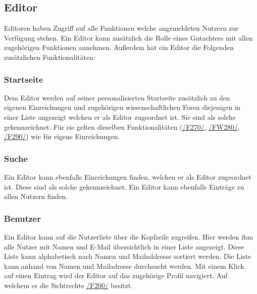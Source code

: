 \subsection{Editor}\label{funkt:editor}
Editoren haben Zugriff auf alle Funktionen welche angemeldeten Nutzern zur Verfügung stehen. Ein Editor kann zusätzlich
die Rolle eines Gutachters mit allen zugehörigen Funktionen annehmen.
Außerdem hat ein Editor die Folgenden zusätzlichen Funktionalitäten:

\subsubsection{Startseite}
\begin{description}
     Dem Editor werden auf seiner personalisierten Startseite zusätzlich zu den eigenen
    Einreichungen und zugehörigen wissenschaftlichen Foren diejenigen in einer
    Liste angezeigt welchen er als Editor zugeordnet ist. Sie sind als solche gekennzeichnet.
    Für sie gelten dieselben Funktionalitäten (\hyperref[funkt:270]{/F270/}, \hyperref[funkt:280]{/FW280/}, \hyperref[funkt:290]{/F290/})
    wie für eigene Einreichungen.
\end{description}

\subsubsection{Suche}
\begin{description}
     Ein Editor kann ebenfalls Einreichungen finden, welchen er als Editor zugeordnet ist.
    Diese sind als solche gekennzeichnet.
     Ein Editor kann ebenfalls Einträge zu allen Nutzern finden.
\end{description}

\subsubsection{Benutzer}
\begin{description}
     Ein Editor kann auf die Nutzerliste über die Kopfzeile zugreifen.
     Hier werden ihm alle Nutzer mit Namen und E-Mail übersichtlich in einer Liste angezeigt.
     Diese Liste kann alphabetisch nach Namen und Mailaddresse sortiert werden.
     Die Liste kann anhand von Namen und Mailadresse durchsucht werden.
     Mit einem Klick auf einen Eintrag wird der Editor auf das zugehörige Profil navigiert.
    Auf welchem er die Sichtrechte \hyperref[funkt:200]{/F200/} besitzt.
\end{description}

